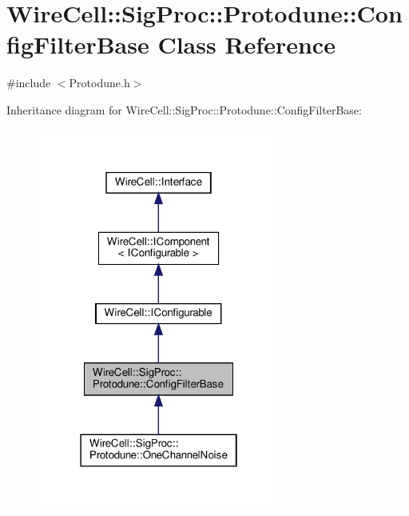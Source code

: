 \hypertarget{class_wire_cell_1_1_sig_proc_1_1_protodune_1_1_config_filter_base}{}\section{Wire\+Cell\+:\+:Sig\+Proc\+:\+:Protodune\+:\+:Config\+Filter\+Base Class Reference}
\label{class_wire_cell_1_1_sig_proc_1_1_protodune_1_1_config_filter_base}


{\ttfamily \#include $<$Protodune.\+h$>$}



Inheritance diagram for Wire\+Cell\+:\+:Sig\+Proc\+:\+:Protodune\+:\+:Config\+Filter\+Base\+:
\nopagebreak
\begin{figure}[H]
\begin{center}
\leavevmode
\includegraphics[width=226pt]{class_wire_cell_1_1_sig_proc_1_1_protodune_1_1_config_filter_base__inherit__graph}
\end{center}
\end{figure}


